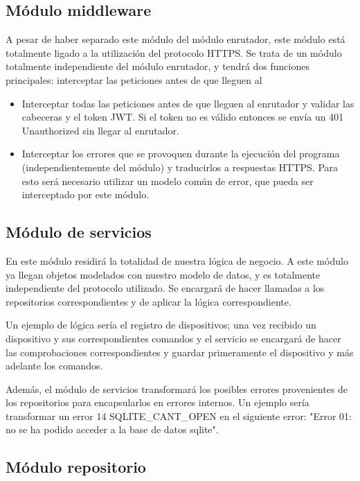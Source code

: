 \subsection{Módulo middleware}
A pesar de haber separado este módulo del módulo enrutador, este módulo está totalmente ligado a la utilización del protocolo HTTPS. 
Se trata de un módulo totalmente independiente del módulo enrutador, y tendrá dos funciones principales: 
interceptar las peticiones antes de que lleguen al
\begin{itemize}
\item Interceptar todas las peticiones antes de que lleguen al enrutador y validar las cabeceras y el token JWT. Si el token no es válido entonces
se envía un 401 Unauthorized sin llegar al enrutador.
\item Interceptar los errores que se provoquen durante la ejecución del programa (independientemente del módulo) y traducirlos a respuestas HTTPS. Para esto 
será necesario utilizar un modelo común de error, que pueda ser interceptado por este módulo.
\end{itemize}
\subsection{Módulo de servicios}
En este módulo residirá la totalidad de nuestra lógica de negocio. A este módulo ya llegan objetos modelados con nuestro modelo de datos, y es totalmente
independiente del protocolo utilizado. Se encargará de hacer llamadas a los repositorios correspondientes y de aplicar la lógica correspondiente.
\par
Un ejemplo de lógica sería el registro de dispositivos; una vez recibido un dispositivo y sus correspondientes comandos y el servicio se encargará de hacer
las comprobaciones correspondientes y guardar primeramente el dispositivo y más adelante los comandos.
\par
Además, el módulo de servicios transformará los posibles errores provenientes de los repositorios para encapsularlos en errores internos. Un ejemplo sería
transformar un error 14 SQLITE_CANT_OPEN en el siguiente error: "Error 01: no se ha podido acceder a la base de datos sqlite".
\subsection{Módulo repositorio}


